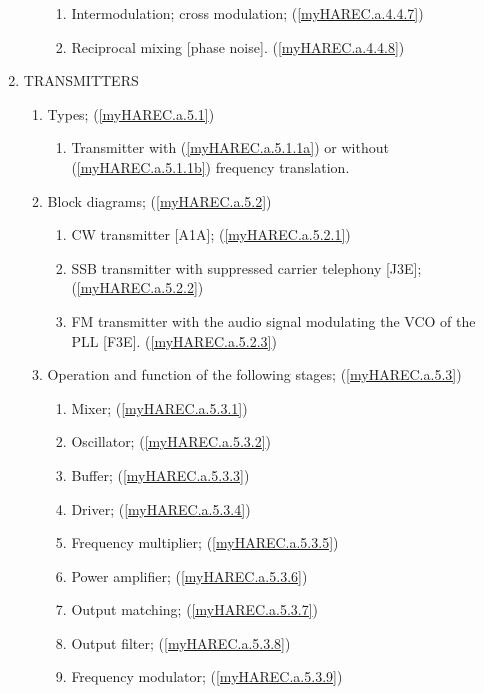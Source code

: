 \begin{enumerate}
\begin{enumerate}[noitemsep]
\begin{enumerate}[noitemsep]
\item Intermodulation; cross modulation; (\ref{myHAREC.a.4.4.7})\label{HAREC.a.4.4.7}
\item Reciprocal mixing [phase noise]. (\ref{myHAREC.a.4.4.8})\label{HAREC.a.4.4.8}
\end{enumerate}
\end{enumerate}
\item TRANSMITTERS
\begin{enumerate}[noitemsep]
\item Types; (\ref{myHAREC.a.5.1})\label{HAREC.a.5.1}
\begin{enumerate}[noitemsep]
\item Transmitter with (\ref{myHAREC.a.5.1.1a})\label{HAREC.a.5.1.1a} or without (\ref{myHAREC.a.5.1.1b})\label{HAREC.a.5.1.1b} frequency translation.
\end{enumerate}
\item Block diagrams; (\ref{myHAREC.a.5.2})\label{HAREC.a.5.2}
\begin{enumerate}[noitemsep]
\item CW transmitter [A1A]; (\ref{myHAREC.a.5.2.1})\label{HAREC.a.5.2.1}
\item SSB transmitter with suppressed carrier telephony [J3E]; (\ref{myHAREC.a.5.2.2})\label{HAREC.a.5.2.2}
\item FM transmitter with the audio signal modulating the VCO of the PLL [F3E]. (\ref{myHAREC.a.5.2.3})\label{HAREC.a.5.2.3}
\end{enumerate}
\item Operation and function of the following stages; (\ref{myHAREC.a.5.3})\label{HAREC.a.5.3}
\begin{enumerate}[noitemsep]
\item Mixer; (\ref{myHAREC.a.5.3.1})\label{HAREC.a.5.3.1}
\item Oscillator; (\ref{myHAREC.a.5.3.2})\label{HAREC.a.5.3.2}
\item Buffer; (\ref{myHAREC.a.5.3.3})\label{HAREC.a.5.3.3}
\item Driver; (\ref{myHAREC.a.5.3.4})\label{HAREC.a.5.3.4}
\item Frequency multiplier; (\ref{myHAREC.a.5.3.5})\label{HAREC.a.5.3.5}
\item Power amplifier; (\ref{myHAREC.a.5.3.6})\label{HAREC.a.5.3.6}
\item Output matching; (\ref{myHAREC.a.5.3.7})\label{HAREC.a.5.3.7}
\item Output filter; (\ref{myHAREC.a.5.3.8})\label{HAREC.a.5.3.8}
\item Frequency modulator; (\ref{myHAREC.a.5.3.9})\label{HAREC.a.5.3.9}

\end{enumerate}
\end{enumerate}
\end{enumerate}
